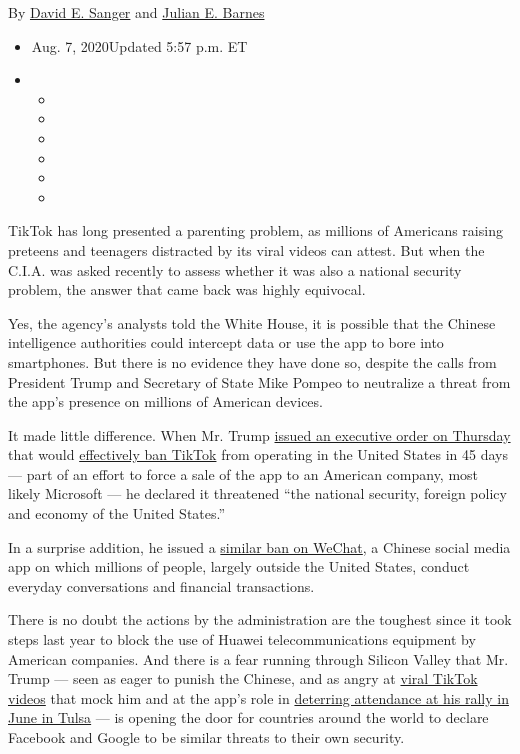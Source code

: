 By \href{https://www.nytimes3xbfgragh.onion/by/david-e-sanger}{David E.
Sanger} and
\href{https://www.nytimes3xbfgragh.onion/by/julian-e-barnes}{Julian E.
Barnes}

\begin{itemize}
\item
  Aug. 7, 2020Updated 5:57 p.m. ET
\item
  \begin{itemize}
  \item
  \item
  \item
  \item
  \item
  \item
  \end{itemize}
\end{itemize}

TikTok has long presented a parenting problem, as millions of Americans
raising preteens and teenagers distracted by its viral videos can
attest. But when the C.I.A. was asked recently to assess whether it was
also a national security problem, the answer that came back was highly
equivocal.

Yes, the agency's analysts told the White House, it is possible that the
Chinese intelligence authorities could intercept data or use the app to
bore into smartphones. But there is no evidence they have done so,
despite the calls from President Trump and Secretary of State Mike
Pompeo to neutralize a threat from the app's presence on millions of
American devices.

It made little difference. When Mr. Trump
\href{https://www.nytimes3xbfgragh.onion/2020/08/06/technology/trump-wechat-tiktok-china.html}{issued
an executive order on Thursday} that would
\href{https://www.whitehouse.gov/presidential-actions/executive-order-addressing-threat-posed-tiktok/}{effectively
ban TikTok} from operating in the United States in 45 days --- part of
an effort to force a sale of the app to an American company, most likely
Microsoft --- he declared it threatened ``the national security, foreign
policy and economy of the United States.''

In a surprise addition, he issued a
\href{https://www.whitehouse.gov/presidential-actions/executive-order-addressing-threat-posed-wechat/}{similar
ban on WeChat}, a Chinese social media app on which millions of people,
largely outside the United States, conduct everyday conversations and
financial transactions.

There is no doubt the actions by the administration are the toughest
since it took steps last year to block the use of Huawei
telecommunications equipment by American companies. And there is a fear
running through Silicon Valley that Mr. Trump --- seen as eager to
punish the Chinese, and as angry at
\href{https://www.nytimes3xbfgragh.onion/2020/05/27/arts/television/trump-sarah-cooper.html}{viral
TikTok videos} that mock him and at the app's role in
\href{https://www.nytimes3xbfgragh.onion/2020/06/21/style/tiktok-trump-rally-tulsa.html}{deterring
attendance at his rally in June in Tulsa} --- is opening the door for
countries around the world to declare Facebook and Google to be similar
threats to their own security.

